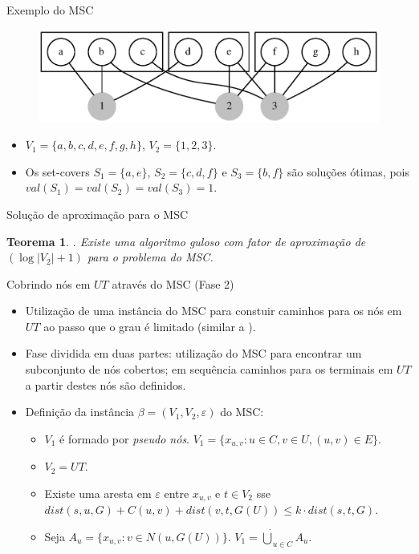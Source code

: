 \documentclass[10pt]{beamer}
\newtheorem{teorema}[theorem]{Teorema}
\begin{document}
\begin{frame}{Exemplo do MSC}
\begin{figure}[H]
\centering
\includegraphics[scale=0.60]{imagens/msc}
\label{fig:msc}
\end{figure}

\begin{itemize}
  \item $V_1 = \lbrace a,b,c,d,e,f,g,h \rbrace$, $V_2 = \lbrace 1,2,3 \rbrace$.
  \item Os set-covers $S_1 = \lbrace a,e \rbrace$, $S_2 = \lbrace c,d,f \rbrace$ e $S_3 = \lbrace b,f \rbrace$ são soluções ótimas, pois $val(S_1) = val(S_2) = val(S_3) = 1$.
\end{itemize}
\end{frame}

\begin{frame}{Solução de aproximação para o MSC}
\begin{teorema}
  \label{teorema:fator_aproximacao}
  \cite{Chekuri2004}. Existe uma algoritmo guloso com fator de aproximação de $(\log |V_2| + 1)$ para o problema do MSC.
\end{teorema}
\end{frame}

\begin{frame}{Cobrindo nós em $UT$ através do MSC (Fase 2)}
\begin{itemize}
  \item Utilização de uma instância do MSC para constuir caminhos para os nós em $UT$ ao passo que o grau é limitado (similar a \cite{Elkin2006}).
  \item Fase dividida em duas partes: utilização do MSC para encontrar um subconjunto de nós cobertos; em sequência caminhos para os terminais em $UT$ a partir destes nós 
são definidos.
  \item Definição da instância $\beta=(V_1, V_2, \varepsilon)$ do MSC:
  \begin{itemize}
    \item $V_1$ é formado por \emph{pseudo nós}. $V_1 = \lbrace x_{u,v} : u \in C, v \in U, (u,v) \in E \rbrace$.
    \item $V_2 = UT$.
    \item Existe uma aresta em $\varepsilon$ entre $x_{u,v}$ e $t \in V_2$ sse $dist(s, u, G) + C(u, v) + dist(v,t,G(U)) \leq k \cdot dist(s,t,G)$.
    \item Seja $A_u = \lbrace x_{u,v} :  v \in N(u, G(U)) \rbrace$. $V_1 = \dot \bigcup_{u \in C}A_u$.
  \end{itemize}
\end{itemize}
\end{frame}
\end{document}
